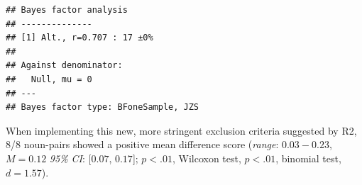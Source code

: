 \documentclass[
  doc,floatsintext]{apa6}
\newenvironment{Shaded}{\begin{snugshade}}{\end{snugshade}}
\newcommand{\CommentTok}[1]{\textcolor[rgb]{0.56,0.35,0.01}{\textit{#1}}}
\newcommand{\FunctionTok}[1]{\textcolor[rgb]{0.13,0.29,0.53}{\textbf{#1}}}
\newcommand{\NormalTok}[1]{#1}
\newcommand{\OtherTok}[1]{\textcolor[rgb]{0.56,0.35,0.01}{#1}}
\newcommand{\SpecialCharTok}[1]{\textcolor[rgb]{0.81,0.36,0.00}{\textbf{#1}}}
\begin{document}
\begin{verbatim}
## Bayes factor analysis
## --------------
## [1] Alt., r=0.707 : 17 ±0%
## 
## Against denominator:
##   Null, mu = 0 
## ---
## Bayes factor type: BFoneSample, JZS
\end{verbatim}

\begin{Shaded}
\end{Shaded}

When implementing this new, more stringent exclusion criteria suggested by R2, \(8\)/8 noun-pairs showed a positive mean difference score (\textit{range}: \(0.03-0.23\), \(M=0.12\) \textit{95\% CI}: {[}\(0.07\), \(0.17\){]}; \(p<.01\), Wilcoxon test, \(p<.01\), binomial test, \(d=1.57\)).
\end{document}

